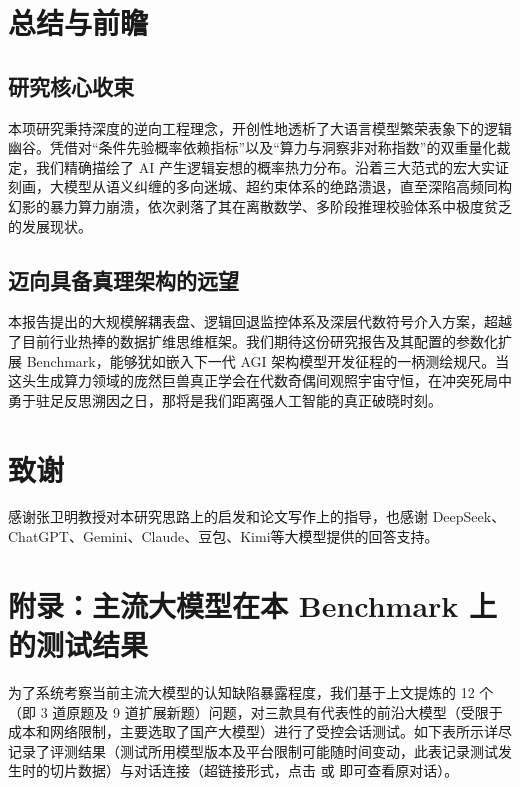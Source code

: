 \documentclass[12pt, a4paper]{report}
\begin{document}
\chapter{总结与前瞻}

\section{研究核心收束}

本项研究秉持深度的逆向工程理念，开创性地透析了大语言模型繁荣表象下的逻辑幽谷。凭借对“条件先验概率依赖指标”以及“算力与洞察非对称指数”的双重量化裁定，我们精确描绘了 AI 产生逻辑妄想的概率热力分布。沿着三大范式的宏大实证刻画，大模型从语义纠缠的多向迷城、超约束体系的绝路溃退，直至深陷高频同构幻影的暴力算力崩溃，依次剥落了其在离散数学、多阶段推理校验体系中极度贫乏的发展现状。

\section{迈向具备真理架构的远望}

本报告提出的大规模解耦表盘、逻辑回退监控体系及深层代数符号介入方案，超越了目前行业热捧的数据扩维思维框架。我们期待这份研究报告及其配置的参数化扩展 Benchmark，能够犹如嵌入下一代 AGI 架构模型开发征程的一柄测绘规尺。当这头生成算力领域的庞然巨兽真正学会在代数奇偶间观照宇宙守恒，在冲突死局中勇于驻足反思溯因之日，那将是我们距离强人工智能的真正破晓时刻。

\chapter*{致谢}
感谢张卫明教授对本研究思路上的启发和论文写作上的指导，也感谢 DeepSeek、ChatGPT、Gemini、Claude、豆包、Kimi等大模型提供的回答支持。

\chapter*{附录：主流大模型在本 Benchmark 上的测试结果}
为了系统考察当前主流大模型的认知缺陷暴露程度，我们基于上文提炼的 12 个（即 3 道原题及 9 道扩展新题）问题，对三款具有代表性的前沿大模型（受限于成本和网络限制，主要选取了国产大模型）进行了受控会话测试。如下表所示详尽记录了评测结果（测试所用模型版本及平台限制可能随时间变动，此表记录测试发生时的切片数据）与对话连接（超链接形式，点击  或  即可查看原对话）。
\end{document}

